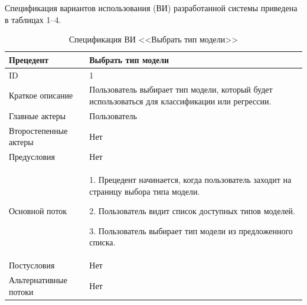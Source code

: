 \newpage
\setcounter{table}{0}
\setcounter{figure}{0}

\label{sec:Appendix}
\label{sec:specification}

Спецификация вариантов использования (ВИ) разработанной системы приведена в таблицах 1--4.
\begin{table}[h]
    \caption{Спецификация ВИ <<Выбрать тип модели>>}
    \fontsize{12pt}{1em}\selectfont
    \vspace{1em}
    \begin{tabularx}{\linewidth}{|l|X|}
       \hline
        Прецедент & Выбрать тип модели\\ \hline
        ID & 1\\ \hline
        Краткое описание & Пользователь выбирает тип модели, который будет использоваться для классификации или регрессии.\\ \hline
        Главные актеры & Пользователь\\ \hline
        Второстепенные актеры & Нет\\ \hline
        Предусловия & Нет \\ \hline
        Основной поток &
        1. Прецедент начинается, когда пользователь заходит на страницу выбора типа модели. 
        
        2. Пользователь видит список доступных типов моделей.
        
        3. Пользователь выбирает тип модели из предложенного списка. \\
        \hline
        Постусловия & Нет \\ \hline
        Альтернативные потоки & Нет \\ \hline
    \end{tabularx} 
    \label{tab:тип}
\end{table}
\vspace{1em}

